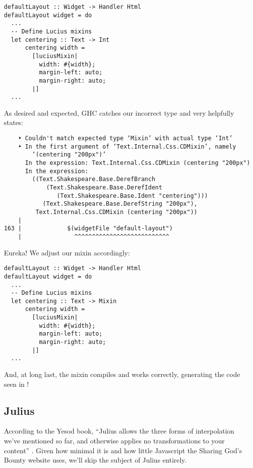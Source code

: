 \begin{Verbatim}
defaultLayout :: Widget -> Handler Html
defaultLayout widget = do
  ...
  -- Define Lucius mixins
  let centering :: Text -> Int
      centering width =
        [luciusMixin|
          width: #{width};
          margin-left: auto;
          margin-right: auto;
        |]
  ...
\end{Verbatim}

As desired and expected, GHC catches our incorrect type and very helpfully states:

\begin{Verbatim}
    • Couldn't match expected type ‘Mixin’ with actual type ‘Int’
    • In the first argument of ‘Text.Internal.Css.CDMixin’, namely
        ‘(centering "200px")’
      In the expression: Text.Internal.Css.CDMixin (centering "200px")
      In the expression:
        ((Text.Shakespeare.Base.DerefBranch
            (Text.Shakespeare.Base.DerefIdent
               (Text.Shakespeare.Base.Ident "centering")))
           (Text.Shakespeare.Base.DerefString "200px"), 
         Text.Internal.Css.CDMixin (centering "200px"))
    |
163 |             $(widgetFile "default-layout")
    |               ^^^^^^^^^^^^^^^^^^^^^^^^^^^
\end{Verbatim}

Eureka! We adjust our mixin accordingly:

\begin{Verbatim}
defaultLayout :: Widget -> Handler Html
defaultLayout widget = do
  ...
  -- Define Lucius mixins
  let centering :: Text -> Mixin
      centering width =
        [luciusMixin|
          width: #{width};
          margin-left: auto;
          margin-right: auto;
        |]
  ...
\end{Verbatim}

And, at long last, the mixin compiles and works correctly, generating the code seen in ! 

\subsection{Julius}

According to the Yesod book, ``Julius allows the three forms of interpolation we’ve mentioned so far, and otherwise applies no transformations to your content'' \cite{ybkShakes}. Given how minimal it is and how little Javascript the Sharing God's Bounty website uses, we'll skip the subject of Julius entirely. 
